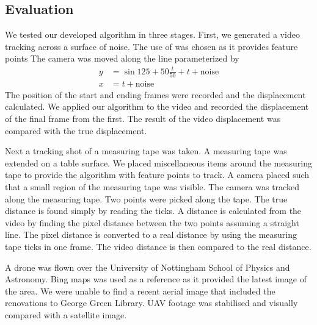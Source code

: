 \subsection{Evaluation}

We tested our developed algorithm in three stages.
First, we generated a video tracking across a surface of noise. %
The use of %
was chosen as it provides feature points 
The camera was moved along the line parameterized by
\begin{align}
  y & = \sin{125+ 50\frac{t}{50}} + t + \text{noise}\\
  x & = t + \text{noise}
\end{align}
The position of the start and ending frames were recorded and the displacement calculated.
We applied our algorithm to the video and recorded the displacement of the final frame from the first.
The result of the video displacement was compared with the true displacement.

Next a tracking shot of a measuring tape was taken.
A measuring tape was extended on a table surface.
We placed miscellaneous items around the measuring tape to provide the algorithm with feature points to track.
A camera placed such that a small region of the measuring tape was visible.
The camera was tracked along the measuring tape.
Two points were picked along the tape.
The true distance is found simply by reading the ticks.
A distance is calculated from the video by finding the pixel distance between the two points assuming a straight line.
The pixel distance is converted to a real distance by using the measuring tape ticks in one frame.
The video distance is then compared to the real distance.

A drone was flown over the University of Nottingham School of Physics and Astronomy.
Bing maps was used as a reference as it provided the latest image of the area.
We were unable to find a recent aerial image that included the renovations to George Green Library.
UAV footage was stabilised and visually compared with a satellite image.
